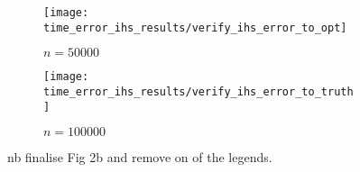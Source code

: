 \begin{figure}
        \centering
        \begin{subfigure}[b]{0.475\textwidth}
            \centering
            \texttt{[image: time\_error\_ihs\_results/verify\_ihs\_error\_to\_opt]}
            \caption{$n=50000$}
            \label{fig: ihs-lasso-error-2-opt}
        \end{subfigure}
        \hfill
        \begin{subfigure}[b]{0.475\textwidth}
            \centering
            \texttt{[image: time\_error\_ihs\_results/verify\_ihs\_error\_to\_truth]}
            \caption{$n=100000$}
            \label{fig: ihs-lasso-error-2-truth}
        \end{subfigure}
        \caption{nb finalise Fig 2b and remove on of the legends.}
        \label{fig: ihs-lasso-opt-truth}
\end{figure}



